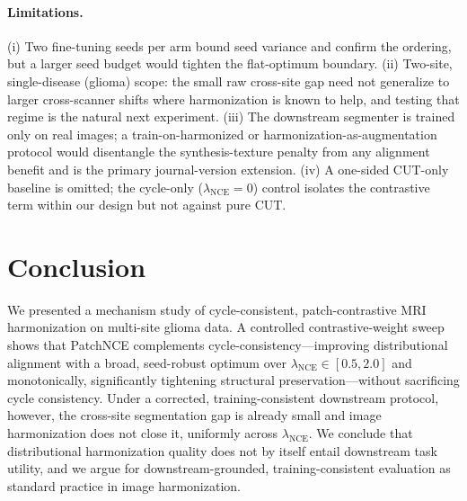 \documentclass[runningheads]{llncs}
\begin{document}
\paragraph{Limitations.}
(i) Two fine-tuning seeds per arm bound seed variance and confirm the ordering,
but a larger seed budget would tighten the flat-optimum boundary. (ii) Two-site, single-disease (glioma) scope: the
small raw cross-site gap need not generalize to larger cross-scanner shifts where
harmonization is known to help, and testing that regime is the natural next
experiment. (iii) The downstream segmenter is trained only on real images; a
train-on-harmonized or harmonization-as-augmentation protocol would disentangle
the synthesis-texture penalty from any alignment benefit and is the primary
journal-version extension. (iv) A one-sided CUT-only baseline is omitted; the
cycle-only ($\lambda_{\mathrm{NCE}}{=}0$) control isolates the contrastive term
within our design but not against pure CUT.

\section{Conclusion}
\label{sec:conclusion}
We presented a mechanism study of cycle-consistent, patch-contrastive MRI
harmonization on multi-site glioma data. A controlled contrastive-weight sweep
shows that PatchNCE complements cycle-consistency---improving distributional
alignment with a broad, seed-robust optimum over $\lambda_{\mathrm{NCE}}\!\in\![0.5,2.0]$
and monotonically, significantly tightening structural preservation---without sacrificing cycle
consistency. Under a corrected, training-consistent downstream protocol, however,
the cross-site segmentation gap is already small and image harmonization does not
close it, uniformly across $\lambda_{\mathrm{NCE}}$. We conclude that
distributional harmonization quality does not by itself entail downstream task
utility, and we argue for downstream-grounded, training-consistent evaluation as
standard practice in image harmonization.



\end{document}

